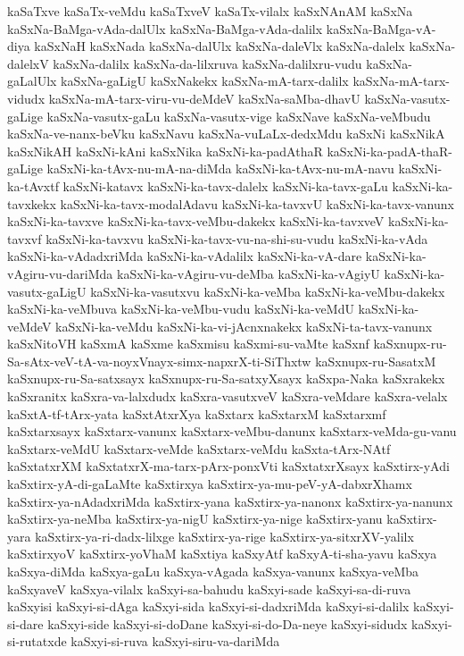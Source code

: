 {kaSaTxve
kaSaTx-veMdu
kaSaTxveV
kaSaTx-vilalx
kaSxNAnAM
kaSxNa
kaSxNa-BaMga-vAda-dalUlx
kaSxNa-BaMga-vAda-dalilx
kaSxNa-BaMga-vA-diya
kaSxNaH
kaSxNada
kaSxNa-dalUlx
kaSxNa-daleVlx
kaSxNa-dalelx
kaSxNa-dalelxV
kaSxNa-dalilx
kaSxNa-da-lilxruva
kaSxNa-dalilxru-vudu
kaSxNa-gaLalUlx
kaSxNa-gaLigU
kaSxNakekx
kaSxNa-mA-tarx-dalilx
kaSxNa-mA-tarx-vidudx
kaSxNa-mA-tarx-viru-vu-deMdeV
kaSxNa-saMba-dhavU
kaSxNa-vasutx-gaLige
kaSxNa-vasutx-gaLu
kaSxNa-vasutx-vige
kaSxNave
kaSxNa-veMbudu
kaSxNa-ve-nanx-beVku
kaSxNavu
kaSxNa-vuLaLx-dedxMdu
kaSxNi
kaSxNikA
kaSxNikAH
kaSxNi-kAni
kaSxNika
kaSxNi-ka-padAthaR
kaSxNi-ka-padA-thaR-gaLige
kaSxNi-ka-tAvx-nu-mA-na-diMda
kaSxNi-ka-tAvx-nu-mA-navu
kaSxNi-ka-tAvxtf
kaSxNi-katavx
kaSxNi-ka-tavx-dalelx
kaSxNi-ka-tavx-gaLu
kaSxNi-ka-tavxkekx
kaSxNi-ka-tavx-modalAdavu
kaSxNi-ka-tavxvU
kaSxNi-ka-tavx-vanunx
kaSxNi-ka-tavxve
kaSxNi-ka-tavx-veMbu-dakekx
kaSxNi-ka-tavxveV
kaSxNi-ka-tavxvf
kaSxNi-ka-tavxvu
kaSxNi-ka-tavx-vu-na-shi-su-vudu
kaSxNi-ka-vAda
kaSxNi-ka-vAdadxriMda
kaSxNi-ka-vAdalilx
kaSxNi-ka-vA-dare
kaSxNi-ka-vAgiru-vu-dariMda
kaSxNi-ka-vAgiru-vu-deMba
kaSxNi-ka-vAgiyU
kaSxNi-ka-vasutx-gaLigU
kaSxNi-ka-vasutxvu
kaSxNi-ka-veMba
kaSxNi-ka-veMbu-dakekx
kaSxNi-ka-veMbuva
kaSxNi-ka-veMbu-vudu
kaSxNi-ka-veMdU
kaSxNi-ka-veMdeV
kaSxNi-ka-veMdu
kaSxNi-ka-vi-jAcnxnakekx
kaSxNi-ta-tavx-vanunx
kaSxNitoVH
kaSxmA
kaSxme
kaSxmisu
kaSxmi-su-vaMte
kaSxnf
kaSxnupx-ru-Sa-sAtx-veV-tA-va-noyxVnayx-simx-napxrX-ti-SiThxtw
kaSxnupx-ru-SasatxM
kaSxnupx-ru-Sa-satxsayx
kaSxnupx-ru-Sa-satxyXsayx
kaSxpa-Naka
kaSxrakekx
kaSxranitx
kaSxra-va-lalxdudx
kaSxra-vasutxveV
kaSxra-veMdare
kaSxra-velalx
kaSxtA-tf-tArx-yata
kaSxtAtxrXya
kaSxtarx
kaSxtarxM
kaSxtarxmf
kaSxtarxsayx
kaSxtarx-vanunx
kaSxtarx-veMbu-danunx
kaSxtarx-veMda-gu-vanu
kaSxtarx-veMdU
kaSxtarx-veMde
kaSxtarx-veMdu
kaSxta-tArx-NAtf
kaSxtatxrXM
kaSxtatxrX-ma-tarx-pArx-ponxVti
kaSxtatxrXsayx
kaSxtirx-yAdi
kaSxtirx-yA-di-gaLaMte
kaSxtirxya
kaSxtirx-ya-mu-peV-yA-dabxrXhamx
kaSxtirx-ya-nAdadxriMda
kaSxtirx-yana
kaSxtirx-ya-nanonx
kaSxtirx-ya-nanunx
kaSxtirx-ya-neMba
kaSxtirx-ya-nigU
kaSxtirx-ya-nige
kaSxtirx-yanu
kaSxtirx-yara
kaSxtirx-ya-ri-dadx-lilxge
kaSxtirx-ya-rige
kaSxtirx-ya-sitxrXV-yalilx
kaSxtirxyoV
kaSxtirx-yoVhaM
kaSxtiya
kaSxyAtf
kaSxyA-ti-sha-yavu
kaSxya
kaSxya-diMda
kaSxya-gaLu
kaSxya-vAgada
kaSxya-vanunx
kaSxya-veMba
kaSxyaveV
kaSxya-vilalx
kaSxyi-sa-bahudu
kaSxyi-sade
kaSxyi-sa-di-ruva
kaSxyisi
kaSxyi-si-dAga
kaSxyi-sida
kaSxyi-si-dadxriMda
kaSxyi-si-dalilx
kaSxyi-si-dare
kaSxyi-side
kaSxyi-si-doDane
kaSxyi-si-do-Da-neye
kaSxyi-sidudx
kaSxyi-si-rutatxde
kaSxyi-si-ruva
kaSxyi-siru-va-dariMda
}
